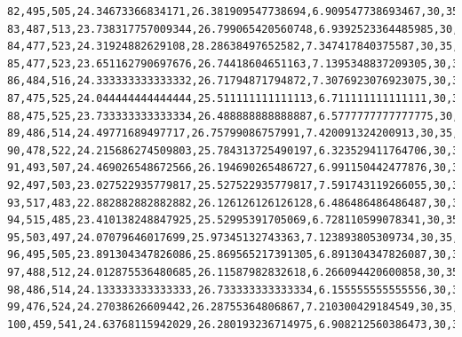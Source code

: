 \documentclass[authoryearcitations]{UoYCSproject}
\begin{document}
\begin{landscape}
\begin{verbatim}
82,495,505,24.34673366834171,26.381909547738694,6.909547738693467,30,35,287,181,93,64,61,70,56,43,37,32,25,17,15,7,10,1,1,0,0
83,487,513,23.738317757009344,26.799065420560748,6.9392523364485985,30,35,302,167,87,61,58,61,67,51,39,29,26,20,16,7,5,3,0,1,0
84,477,523,24.31924882629108,28.28638497652582,7.347417840375587,30,35,300,177,87,53,55,52,59,67,41,31,24,22,22,3,5,2,0,0,0
85,477,523,23.651162790697676,26.74418604651163,7.1395348837209305,30,35,300,181,90,59,51,49,51,54,53,35,21,23,16,11,4,2,0,0,0
86,484,516,24.333333333333332,26.71794871794872,7.3076923076923075,30,35,280,180,88,81,49,52,51,51,45,48,20,22,12,13,6,1,1,0,0
87,475,525,24.044444444444444,25.511111111111113,6.711111111111111,30,35,306,164,106,58,69,46,50,42,45,33,31,21,11,7,7,3,1,0,0
88,475,525,23.733333333333334,26.488888888888887,6.5777777777777775,30,35,320,158,104,64,46,71,39,44,43,34,24,27,13,1,7,4,1,0,0
89,486,514,24.49771689497717,26.75799086757991,7.420091324200913,30,35,314,178,78,76,52,48,63,36,42,31,32,18,18,6,2,6,0,0,0
90,478,522,24.215686274509803,25.784313725490197,6.323529411764706,30,35,285,200,93,61,62,52,45,60,26,41,22,22,15,10,1,3,2,0,0
91,493,507,24.469026548672566,26.194690265486727,6.991150442477876,30,35,313,166,111,56,47,59,50,45,45,21,37,13,20,8,4,1,3,1,0
92,497,503,23.027522935779817,25.527522935779817,7.591743119266055,30,35,308,187,75,80,52,49,55,41,36,39,19,25,13,12,6,2,1,0,0
93,517,483,22.882882882882882,26.126126126126128,6.486486486486487,30,35,315,173,101,49,73,46,48,49,30,31,33,14,16,11,9,1,1,0,0
94,515,485,23.410138248847925,25.52995391705069,6.728110599078341,30,35,307,182,96,73,41,71,40,42,41,24,30,18,12,13,7,2,1,0,0
95,503,497,24.07079646017699,25.97345132743363,7.123893805309734,30,35,318,173,97,74,59,42,58,38,31,26,26,26,8,10,8,6,0,0,0
96,495,505,23.891304347826086,25.869565217391305,6.891304347826087,30,35,326,176,87,76,63,53,40,46,35,23,23,22,12,7,7,3,1,0,0
97,488,512,24.012875536480685,26.11587982832618,6.266094420600858,30,35,337,172,85,57,67,59,51,41,32,30,20,15,21,5,5,2,1,0,0
98,486,514,24.133333333333333,26.733333333333334,6.155555555555556,30,35,319,195,101,52,43,64,50,42,32,28,26,15,18,10,1,3,1,0,0
99,476,524,24.27038626609442,26.28755364806867,7.210300429184549,30,35,336,163,118,60,43,51,49,44,39,26,19,24,11,11,5,1,0,0,0
100,459,541,24.63768115942029,26.280193236714975,6.908212560386473,30,35,302,184,108,78,53,41,50,41,35,35,21,23,14,9,5,1,0,0,0
\end{verbatim}
\end{landscape}
\end{document}
